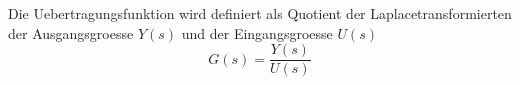 Die Uebertragungsfunktion wird definiert als Quotient der Laplacetransformierten der Ausgangsgroesse $Y(s)$ und der Eingangsgroesse $U(s)$
$$G(s) = \frac{Y(s)}{U(s)}$$
